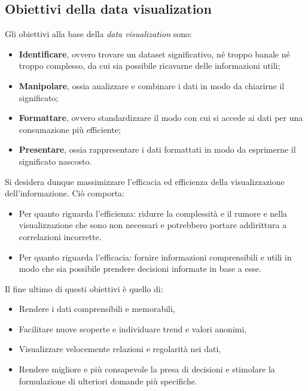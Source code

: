 \subsection{Obiettivi della data visualization}
Gli obiettivi alla base della \emph{data visualization} sono:
\begin{itemize}
    \item \textbf{Identificare}, ovvero trovare un dataset significativo, né troppo banale né troppo complesso, da cui sia possibile
    ricavarne delle informazioni utili;
    \item \textbf{Manipolare}, ossia analizzare e combinare i dati in modo da chiarirne il significato;
    \item \textbf{Formattare}, ovvero standardizzare il modo con cui si accede ai dati per una consumazione più efficiente;
    \item \textbf{Presentare}, ossia rappresentare i dati formattati in modo da esprimerne il significato nascosto.
\end{itemize}
\noindent Si desidera dunque massimizzare l'efficacia ed efficienza della visualizzazione dell'informazione. Ciò comporta:
\begin{itemize}
    \item Per quanto riguarda l'efficienza: ridurre la complessità e il rumore e nella visualizzazione che sono non necessari e potrebbero
    portare addirittura a correlazioni incorrette.
    \item Per quanto riguarda l'efficacia: fornire informazioni comprensibili e utili in modo che sia possibile prendere decisioni informate in base a esse.
\end{itemize}

\bigskip
\noindent Il fine ultimo di questi obiettivi è quello di:
\begin{itemize}
    \item Rendere i dati comprensibili e memorabili,
    \item Facilitare nuove scoperte e individuare trend e valori anonimi,
    \item Visualizzare velocemente relazioni e regolarità nei dati,
    \item Rendere migliore e più consapevole la presa di decisioni e stimolare la formulazione di ulteriori domande più specifiche.
\end{itemize} 


